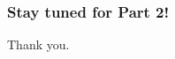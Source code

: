 \documentclass[./main.tex]{subfiles}
\begin{document}
\begin{frame}[label=slide16]
        \frametitle{Stay tuned for Part 2!}

        \nocite{*}
        
        

        \vspace{1cm}

        Thank you.

        \bigskip

        \hyperlink{slide02}{}
        \hyperlink{slide07}{}
        \hyperlink{slide08}{}
        \hyperlink{slide13}{}
\end{frame}
\end{document}
